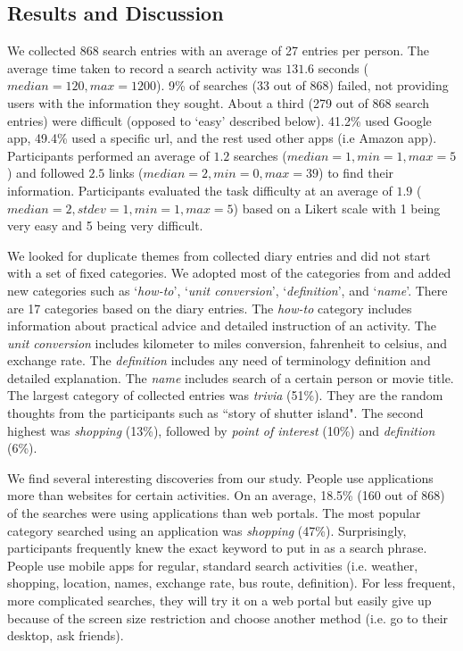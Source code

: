 \subsection{Results and Discussion}
We collected 868 search entries with an average of 27 entries per person.
The average time taken to record a search activity was $131.6$ seconds ($median=120, max=1200$). 9\% of searches (33 out of 868) failed, not providing users with the information they sought. About a third (279 out of 868 search entries) were difficult (opposed to `easy' described below). 41.2\% used Google app, 49.4\% used a specific url, and the rest used other apps (i.e Amazon app). Participants performed an average of $1.2$ searches ($median=1, min =1, max=5$) and followed $2.5$ links ($median=2, min=0, max=39$) to find their information. Participants evaluated the task difficulty at an average of $1.9$ ($median=2,  stdev=1, min=1, max=5$) based on a Likert scale with 1 being very easy and 5 being very difficult. 

We looked for duplicate themes from collected diary entries and did not start with a set of fixed categories. We adopted most of the categories from \cite{chi2008} and added new categories such as `\emph{how-to}', `\emph{unit conversion}', `\emph{definition}', and `\emph{name}'. There are 17 categories based on the diary entries.
The \emph{how-to} category includes information about practical advice and detailed instruction of an activity. The \emph{unit conversion} includes kilometer to miles conversion, fahrenheit to celsius, and exchange rate. The \emph{definition} includes any need of terminology definition and detailed explanation. The \emph{name} includes search of a certain person or movie title. The largest category of collected entries was \emph{trivia} (51\%). They are the random thoughts from the participants such as ``story of shutter island". The second highest was \emph{shopping} (13\%), followed by \emph{point of interest} (10\%) and \emph{definition} (6\%).

We find several interesting discoveries from our study. People use applications more than websites for certain activities. On an average, 18.5\% (160 out of 868) of the searches were using applications than web portals. The most popular category searched using an application was \emph{shopping} (47\%). Surprisingly, participants frequently knew the exact keyword to put in as a search phrase. People use mobile apps for regular, standard search activities (i.e. weather, shopping, location, names, exchange rate, bus route, definition). For less frequent, more complicated searches, they will try it on a web portal but easily give up because of the screen size restriction and choose another method (i.e. go to their desktop, ask friends).

